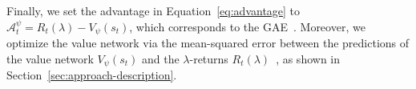 Finally, we set the advantage in Equation~\ref{eq:advantage} to $\mathcal{A}_t^{\psi} = R_t(\lambda) - V_\psi(s_t)$, 
which corresponds to the GAE~\cite{Schulman2016GAE}.
Moreover, we optimize the value network via the mean-squared error between the predictions of the value network $V_\psi(s_t)$ and the
$\lambda$-returns $R_t(\lambda)$~\cite{Peng2018Mimic}, as shown in Section~\ref{sec:approach-description}.










